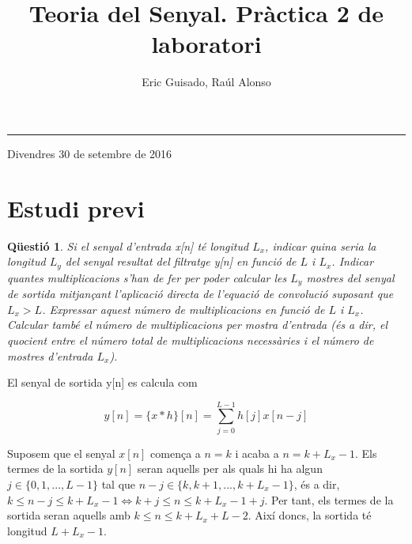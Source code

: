 \documentclass[11pt,a4]{article}
\title{Teoria del Senyal. Pràctica 2 de laboratori}
\author{Eric Guisado, Raúl Alonso}
\numberwithin{equation}{section}
\theoremstyle{thmstyle}
\theoremstyle{thmstyle}
\theoremstyle{thmstyle}
\theoremstyle{thmstyle}
\theoremstyle{thmstyle}
\theoremstyle{thmstyle}
\newtheorem{question}{Qüestió}
\begin{document}

\thispagestyle{empty}

\noindent
{\bf \LARGE \thetitle}

\noindent
\rule{\textwidth}{1pt}

\vspace{15pt}

\noindent
{\Large \theauthor}
\vspace{15pt}

\noindent
{\large Divendres 30 de setembre de 2016}
\vspace{15pt}

\tableofcontents

\section{Estudi previ}
\begin{question}
Si el senyal d’entrada x[n] té longitud $L_x$, indicar quina seria la longitud $L_y$ del senyal resultat del filtratge y[n] en funció de $L$ i $L_x$. Indicar quantes multiplicacions s’han de fer per poder calcular les $L_y$ mostres del senyal de sortida mitjançant l’aplicació directa de l’equació de convolució suposant que $L_x > L$. Expressar aquest número de multiplicacions en funció de $L$ i $L_x$. Calcular també el número de multiplicacions per mostra d’entrada (és a dir, el quocient entre el número total de multiplicacions necessàries i el número de mostres d’entrada $L_x$).
\end{question}

El senyal de sortida y[n] es calcula com 

$$
y[n]=\lbrace x\ast h\rbrace[n]=\sum_{j=0}^{L-1} h[j]x[n-j]
$$

Suposem que el senyal $x[n]$ comença a $n=k$ i acaba a $n=k+L_x-1$. Els termes de la sortida $y[n]$ seran aquells per als quals hi ha algun $j\in\lbrace 0, 1, ..., L-1\rbrace$ tal que $n-j\in \lbrace k, k+1, ..., k+L_x-1\rbrace$, és a dir, $k\leqslant n-j \leqslant k+L_x-1 \Longleftrightarrow k+j\leqslant n \leqslant k+L_x-1+j$. Per tant, els termes de la sortida seran aquells amb $k\leqslant n \leq k+L_x+L-2$. Així doncs, la sortida té longitud $L+L_x-1$.
\end{document}
